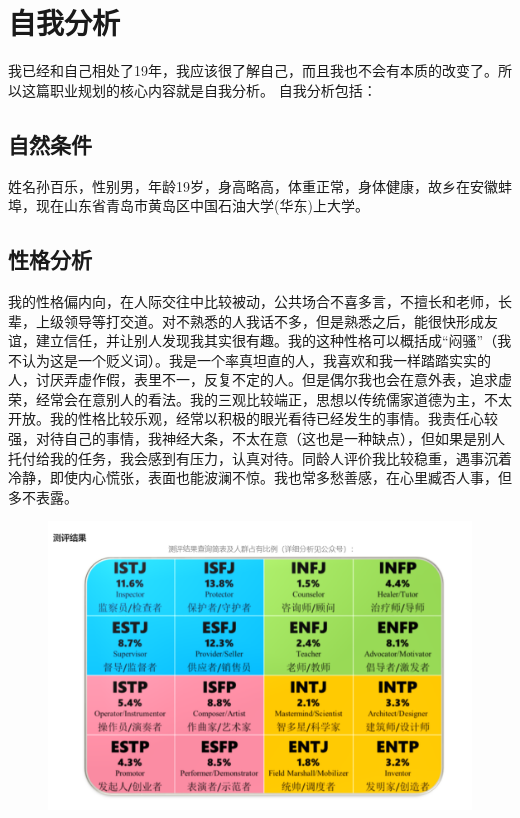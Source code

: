 \documentclass{article}
\begin{document}
\thispagestyle{empty}
\newpage
\setcounter{page}{1}
\section{自我分析}
	我已经和自己相处了19年，我应该很了解自己，而且我也不会有本质的改变了。所以这篇职业规划的核心内容就是自我分析。
	自我分析包括：
\subsection{自然条件}
姓名孙百乐，性别男，年龄19岁，身高略高，体重正常，身体健康，故乡在安徽蚌埠，现在山东省青岛市黄岛区中国石油大学(华东)上大学。\par
\subsection{性格分析}
我的性格偏内向，在人际交往中比较被动，公共场合不喜多言，不擅长和老师，长辈，上级领导等打交道。对不熟悉的人我话不多，但是熟悉之后，能很快形成友谊，建立信任，并让别人发现我其实很有趣。我的这种性格可以概括成“闷骚”（我不认为这是一个贬义词）。我是一个率真坦直的人，我喜欢和我一样踏踏实实的人，讨厌弄虚作假，表里不一，反复不定的人。但是偶尔我也会在意外表，追求虚荣，经常会在意别人的看法。我的三观比较端正，思想以传统儒家道德为主，不太开放。我的性格比较乐观，经常以积极的眼光看待已经发生的事情。我责任心较强，对待自己的事情，我神经大条，不太在意（这也是一种缺点），但如果是别人托付给我的任务，我会感到有压力，认真对待。同龄人评价我比较稳重，遇事沉着冷静，即使内心慌张，表面也能波澜不惊。我也常多愁善感，在心里臧否人事，但多不表露。\par
\begin{figure}[H]
	\centering
	\includegraphics[width=0.8\linewidth]{性格测试1}
	\caption{}
	\label{fig:1}
\end{figure}
\end{document}
